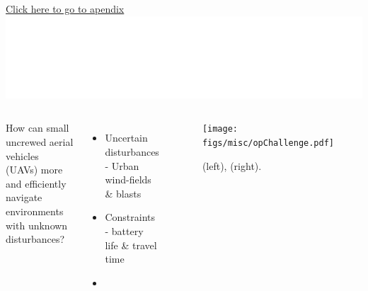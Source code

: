 \begin{frame}[t]{\hyperlink{apdx:intro}{Click here to go to apendix} \hfill \includegraphics[height=.5cm]{figs/uncc/whiteUNCCLogo.eps}}
\begin{columns}[T,onlytextwidth]
{\begin{center}
                \vspace*{0.55cm}
                \Large{How can small uncrewed aerial vehicles (UAVs) more  and efficiently navigate environments with unknown disturbances?}
            \end{center}
            \begin{itemize}
                \item Uncertain disturbances - Urban wind-fields \& blasts
                \item Constraints - battery life \& travel time
                \item {}
            \end{itemize}
        }
            \begin{center}
                \begin{figure}
                    \texttt{[image: figs/misc/opChallenge.pdf]}
                    \captionsetup{labelformat=empty}
                    \caption{\color{white}(left)\cite{martin2020assessing}, (right)\cite{Watkins2020}.}
                \end{figure}
            \end{center}
    \end{columns}
\end{frame}

